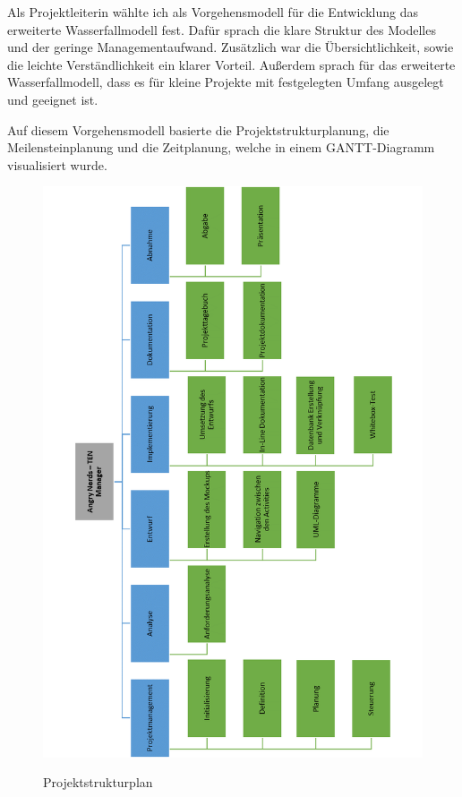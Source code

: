 Als Projektleiterin wählte ich als Vorgehensmodell für die Entwicklung das erweiterte Wasserfallmodell fest. Dafür sprach die klare Struktur des Modelles und der geringe Managementaufwand. Zusätzlich war die Übersichtlichkeit, sowie die leichte Verständlichkeit ein klarer Vorteil. Außerdem sprach für das erweiterte Wasserfallmodell, dass es für kleine Projekte mit festgelegten Umfang ausgelegt und geeignet ist.

Auf diesem Vorgehensmodell basierte die Projektstrukturplanung, die Meilensteinplanung und die Zeitplanung, welche in einem GANTT-Diagramm visualisiert wurde.

\begin{figure}[H]
\centering
\begin{minipage}[t]{1\textwidth} %
\caption{Projektstrukturplan} %
\includegraphics[width=13cm]{img/Projektstrukturplan}\\ %
\end{minipage}
\end{figure}

